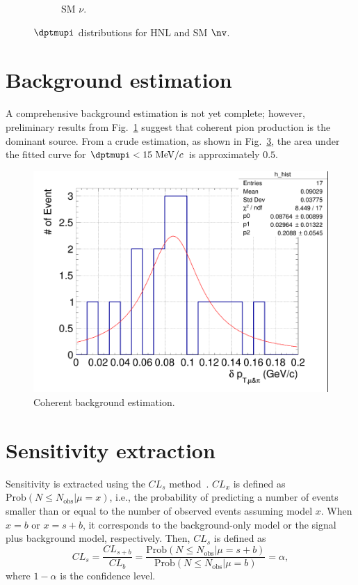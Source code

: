 \begin{figure}[!htb]
\begin{subfigure}{0.45\textwidth}
                \caption{SM $\nu$.}
                \label{fig:sm-mupidpt}
           \end{subfigure}
           \caption{$\dptmupi$ distributions for HNL and SM $\nv$.}
           \label{fig:mmupi-dpt}
        \end{figure}

    
    \section{Background estimation}
        A comprehensive background estimation is not yet complete; however, preliminary results from Fig.~\ref{fig:sm-mupidpt} suggest that coherent pion production is the dominant source. 
        From a crude estimation, as shown in Fig.~\ref{fig:coh-bkg}, the area under the fitted curve for $\dptmupi<15~\mevc$ is approximately $0.5$. 
        \begin{figure}[!htb] 
            \centering
            \includegraphics[width=0.5\linewidth]{figures/COH.png}
            \caption{Coherent background estimation.}
            \label{fig:coh-bkg}
        \end{figure}    
    
    \section{Sensitivity extraction}
        Sensitivity is extracted using the $CL_s$ method~\cite{Read:2002hq}.
        $CL_x$ is defined as $\textrm{Prob}(N\leq N_{\textrm{obs}}| \mu = x)$, i.e., the probability of predicting a number of events smaller than or equal to the number of observed events assuming model $x$. When $x=b$ or $x=s+b$, it corresponds to the background-only model or the signal plus background model, respectively.
        Then, $CL_s$ is defined as 
        \begin{equation}
            CL_s = \frac{CL_{s+b}}{CL_{b}} = \frac{\textrm{Prob}(N\leq N_{\textrm{obs}}| \mu = s+b)}{\textrm{Prob}(N\leq N_{\textrm{obs}}| \mu = b)} = \alpha,
        \end{equation}
        where $1-\alpha$ is the confidence level.

